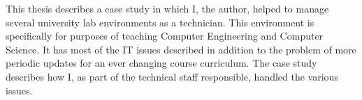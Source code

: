 
This thesis describes a case study in which I, the author, helped to manage several university lab environments as a technician.  This environment is specifically for purposes of teaching Computer Engineering and Computer Science.  It has most of the IT issues described in addition to the problem of more periodic updates for an ever changing course curriculum.  The case study describes how I, as part of the technical staff responsible, handled the various issues.
